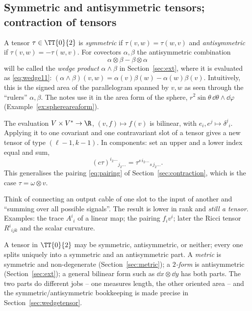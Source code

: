 \subsection{Symmetric and antisymmetric tensors; contraction of tensors}\label{sec:symcontr}
A tensor $\tau\in\TT{0}{2}$ is \emph{symmetric} if $\tau(v,w)=\tau(w,v)$ and \emph{antisymmetric} if $\tau(v,w)=-\tau(w,v)$.
For covectors $\alpha,\beta$ the antisymmetric combination
\[
\alpha\otimes\beta-\beta\otimes\alpha
\]
will be called the \emph{wedge product} $\alpha\wedge\beta$ in Section~\ref{sec:ext}, where it is evaluated as
\eqref{eq:wedge11}: $(\alpha\wedge\beta)(v,w)=\alpha(v)\beta(w)-\alpha(w)\beta(v)$. Intuitively, this is the signed area of the
parallelogram spanned by $v,w$ as seen through the ``rulers'' $\alpha,\beta$. The notes use it in the area form of the sphere,
$r^2\sin\theta\,\dd\theta\wedge\dd\varphi$ (Example~\ref{ex:sphereareaform}).

\begin{formal}[{contraction}]
The evaluation $V\times V^*\to\R$, $(v,f)\mapsto f(v)$ is bilinear, with $e_i,e^{j}\mapsto\delta^j{}_i$. Applying it to one covariant and one contravariant slot of a tensor gives a new tensor of type $(\ell-1,k-1)$. In components: set an upper and a lower index equal and sum,
\[
(c\tau)^{i_2\dots}{}_{j_2\dots}=\tau^{s\,i_2\dots}{}_{s\,j_2\dots}.
\]
This generalises the pairing \eqref{eq:pairing} of Section~\ref{sec:contraction}, which is the case $\tau=\omega\otimes v$.
\end{formal}
\begin{intuition}[{contraction = plug a vector-slot into a covector-slot}]
Think of connecting an output cable of one slot to the input of another and ``summing over all possible signals''. The result is lower in rank and \emph{still a tensor}. Examples: the trace $A^i{}_i$ of a linear map; the pairing $f_iv^i$; later the Ricci tensor $R^i{}_{ijk}$ and the scalar curvature.
\end{intuition}


\begin{remark}
A tensor in $\TT{0}{2}$ may be symmetric, antisymmetric, or neither; every one splits uniquely into a symmetric and an
antisymmetric part. A \emph{metric} is symmetric and non-degenerate (Section~\ref{sec:metric}); a \emph{$2$-form} is
antisymmetric (Section~\ref{sec:ext}); a general bilinear form such as $\dd x\otimes\dd y$ has both parts. The two parts
do different jobs -- one measures length, the other oriented area -- and the symmetric/antisymmetric bookkeeping
is made precise in Section~\ref{sec:wedgetensor}.
\end{remark}
